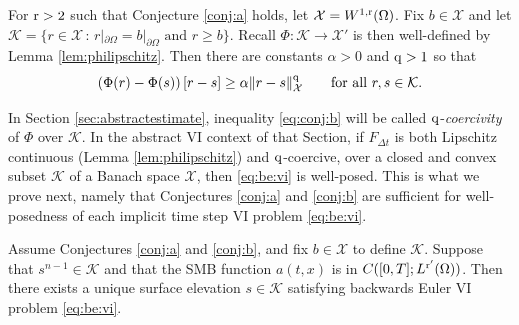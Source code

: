\documentclass[hidelinks,onefignum,onetabnum,final]{siamart220329}  %
\newcommand{\cK}{\mathcal{K}}
\newcommand{\cX}{\mathcal{X}}
\newcommand{\qq}{{\text{\textnormal{q}}}}
\newcommand{\rr}{{\text{\textnormal{r}}}}
\begin{document}
\begin{conjecture} \label{conj:b}  For $\rr>2$ such that Conjecture \ref{conj:a} holds, let $\cX = W^{1,\rr}(\Omega)$.  Fix $b\in\cX$ and let $\cK=\{r\in\cX\,:\,r|_{\partial\Omega}=b|_{\partial\Omega} \text{ and } r\ge b\}$.  Recall $\Phi:\cK\to\cX'$ is then well-defined by Lemma \ref{lem:philipschitz}.  Then there are constants $\alpha>0$ and $\qq>1$ so that
\begin{equation}
\left(\Phi(r) - \Phi(s)\right)[r-s] \ge \alpha \|r-s\|_{\cX}^\qq \qquad \text{for all } r,s\in\cK. \label{eq:conj:b}
\end{equation}
\end{conjecture}

In Section \ref{sec:abstractestimate}, inequality \eqref{eq:conj:b} will be called $\qq$-\emph{coercivity} of $\Phi$ over $\cK$.  In the abstract VI context of that Section, if $F_{\Delta t}$ is both Lipschitz continuous (Lemma \ref{lem:philipschitz}) and $\qq$-coercive, over a closed and convex subset $\cK$ of a Banach space $\cX$, then \eqref{eq:be:vi} is well-posed.  This is what we prove next, namely that Conjectures \ref{conj:a} and \ref{conj:b} are sufficient for well-posedness of each implicit time step VI problem \eqref{eq:be:vi}.

\begin{theorem} \label{thm:stepwellposed}  Assume Conjectures \ref{conj:a} and \ref{conj:b}, and fix $b \in \cX$ to define $\cK$.  Suppose that $s^{n-1}\in\cK$ and that the SMB function $a(t,x)$ is in $C([0,T]; L^{\rr'}(\Omega))$.  Then there exists a unique surface elevation $s\in\cK$ satisfying backwards Euler VI problem \eqref{eq:be:vi}. \end{theorem}
\end{document}
